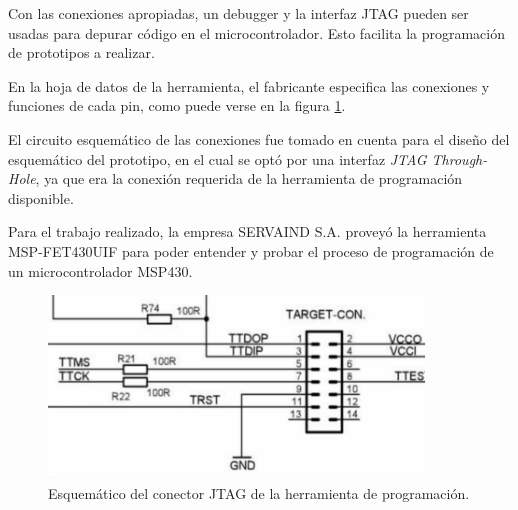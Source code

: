 Con las conexiones apropiadas, un debugger y la interfaz JTAG pueden ser usadas para depurar código en el microcontrolador. Esto facilita la programación de prototipos a realizar. 





En la hoja de datos de la herramienta, el fabricante especifica las conexiones y funciones de cada pin, como puede verse en la figura \ref{fig:JtagSCH}.


El circuito esquemático de las conexiones fue tomado en cuenta para el diseño del esquemático del prototipo, en el cual se optó por una interfaz \textit{JTAG Through-Hole}, ya que era la conexión requerida de la herramienta de programación disponible. 

Para el trabajo realizado, la empresa SERVAIND S.A. proveyó la herramienta MSP-FET430UIF \cite{FETjtag} para poder entender y probar el proceso de programación de un microcontrolador MSP430.


\begin{figure}[!h]
	\centering
	\includegraphics[width=100mm,keepaspectratio]{Figures/Jtagfetsch.png}
	\caption{ Esquemático del conector JTAG de la herramienta de programación. }
	\label{fig:JtagSCH}
\end{figure}

